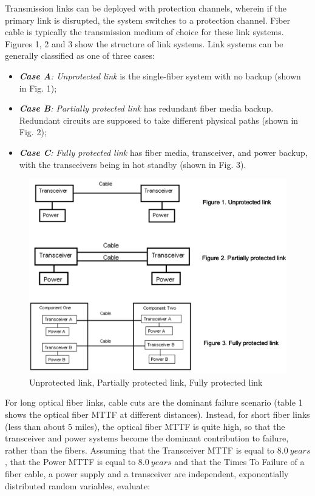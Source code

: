 Transmission links can be deployed with protection channels, wherein if the primary link is disrupted, the system switches to a protection channel. Fiber cable is typically the transmission medium of choice for these link systems. Figures 1, 2 and 3 show the structure of link systems. Link systems can be generally classified as one of three cases: 

\begin{itemize}

\item{\textit{\textbf{Case A}: Unprotected link}} is the single-fiber system with no backup (shown in Fig. 1);
\item{\textit{\textbf{Case B}: Partially protected link}} has redundant fiber media backup. Redundant circuits are supposed to take different physical paths (shown in Fig. 2);
\item{\textit{\textbf{Case C}: Fully protected link}} has fiber media, transceiver, and power backup, with the transceivers being  in  hot standby (shown in Fig. 3).                          

\end{itemize}

\begin{center}
\begin{figure}[H]
\centering
\includegraphics[scale=0.8]{figures/ex/mttffl.png}
\caption{Unprotected link, Partially protected link, Fully protected link}
\end{figure}
\end{center}

For long optical fiber links, cable cuts are the dominant failure scenario (table 1 
shows the optical fiber MTTF at different distances). Instead, for short fiber links (less than about 5 miles), the optical fiber MTTF is quite high, so that the transceiver and power systems become the dominant contribution to failure, rather than the fibers. Assuming that the Transceiver MTTF is equal to $8.0\ years$, that the Power MTTF is equal to $8.0\ years$ and that the Times To Failure of a fiber cable, a power supply and a transceiver are independent, exponentially distributed random variables, evaluate:

